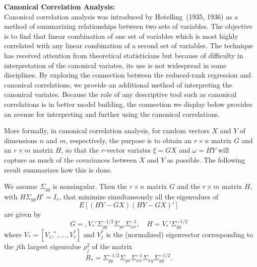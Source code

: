 \noindent \textbf{Canonical Correlation Analysis:} \\


\noindent Canonical correlation analysis was introduced by Hotelling~(1935, 1936) as a method of summarizing relationships between two sets of variables. The objective is to find that linear combination of one set of variables which is most highly correlated with any linear combination of a second set of variables. The technique has received attention from theoretical statisticians but because of difficulty in interpretation of the canonical variates, its use is not widespread in some disciplines. By exploring the connection between the reduced-rank regression and canonical correlations, we provide an additional method of interpreting the canonical variates. Because the role of any descriptive tool such as canonical correlations is in better model building, the connection we display below provides an avenue for interpreting and further using the canonical correlations. 


More formally, in canonical correlation analysis, for random vectors $X$ and $Y$ of dimensions $n$ and $m$, respectively, the purpose is to obtain an $r \times n$ matrix $G$ and an $r \times m$ matrix $H$, so that the $r$-vector variates $\xi=GX$ and $\omega=HY$ will capture as much of the covariances between $X$ and $Y$ as possible. The following result summarizes how this is done. \\

\begin{result}\label{res:4} We assume $\Sigma_{yy}$ is nonsingular. Then the $r \times n$ matrix $G$ and the $r \times m$ matrix $H$, with $H \Sigma_{yy}H'=I_r$, that minimize simultaneously all the eigenvalues of
	\begin{equation}\label{eqn:EHYGX}
	E[(HY-GX)(HY-GX)']
	\end{equation}
are given by
	\[
	G=, V_*' \Sigma_{yy}^{-1/2} \Sigma_{yx} \Sigma_{xx}^{-1},\quad H=V_*' \Sigma_{yy}^{-1/2}
	\]
where $V_*=[V_1,^*,\ldots,V_r^*]$ and $V_j^*$ is the (normalized) eigenvector corresponding to the $j$th largest eigenvalue $\rho_j^2$ of the matrix
	\begin{equation}\label{eqn:eigenlargestmatrix}
	R_*=\Sigma_{yy}^{-1/2} \Sigma_{yx} \Sigma_{xx}^{-1} \Sigma_{xy} \Sigma_{yy}^{-1/2}.
	\end{equation}
\end{result}


